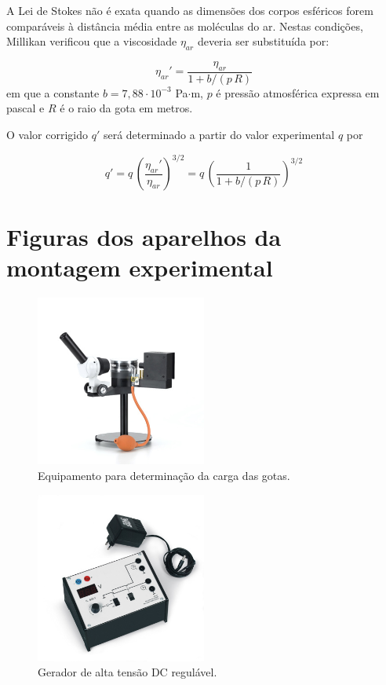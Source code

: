\documentclass[a4paper,twoside,11pt]{report}      %
\begin{document}
A Lei de Stokes não é exata quando as dimensões dos corpos esféricos forem comparáveis à distância média entre as moléculas do ar. Nestas condições, Millikan verificou que a viscosidade $\eta_{ar}$ deveria ser substituída por:

\begin{equation}
	\label{eq:correcao}
	\eta_{ar}' = \frac{\eta_{ar}}{1 + b/(p\,R)}  
\end{equation}
em que a constante $b=7,88\cdot 10^{-3}$ Pa$\cdot$m, 
$p$ é pressão atmosférica expressa em pascal e $R$ é o raio da gota em metros.

O valor corrigido $q'$ será  determinado a partir do valor experimental $q$ por

\begin{equation}
	\label{eq:correcao1}
	q' = q\, \left(\frac{\eta_{ar}'}{\eta_{ar}}\right)^{3/2}  =q\, \left(\frac{1}{1 + b/(p\,R)}\right)^{3/2}  
\end{equation}

\section{\sf Figuras dos aparelhos da montagem experimental}
\begin{figure}
	[htb]  \centering 
	\includegraphics[width=0.5\textwidth]{./U131001_01_Aparelho-de-Millikan}
	\caption{Equipamento para determinação da carga das gotas. \label{fig:Equi}} 
\end{figure}

\begin{figure}
	[htb]  \centering 
	\includegraphics[width=0.5\textwidth]{./U13105-230_01_Aparelho-operacional-de-Millikan}
	\caption{Gerador de alta tensão DC regulável. \label{fig:fonteDC_HT}} 
\end{figure}
\end{document}
